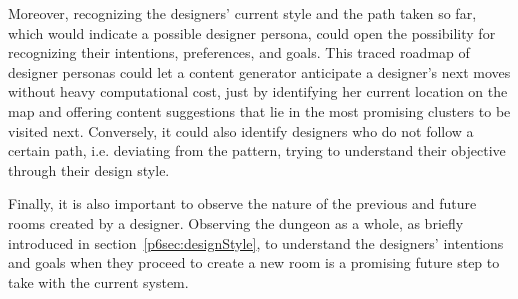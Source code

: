 Moreover, recognizing the designers' current style and the path taken so far, which would indicate a possible designer persona, could open the possibility for recognizing their intentions, preferences, and goals. This traced roadmap of designer personas could let a content generator anticipate a designer's next moves without heavy computational cost, just by identifying her current location on the map and offering content suggestions that lie in the most promising clusters to be visited next. Conversely, it could also identify designers who do not follow a certain path, i.e. deviating from the pattern, trying to understand their objective through their design style.



Finally, it is also important to observe the nature of the previous and future rooms created by a designer. Observing the dungeon as a whole, as briefly introduced in section~\ref{p6sec:designStyle}, to understand the designers' intentions and goals when they proceed to create a new room is a promising future step to take with the current system. 


